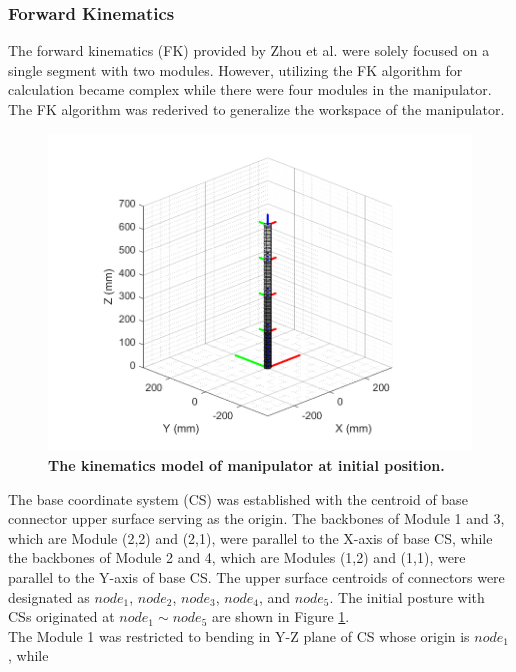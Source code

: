 \subsubsection{Forward Kinematics}
The forward kinematics (FK) provided by Zhou et al. \cite{fishboneCR} were solely focused on a single segment 
with two modules. However, utilizing the FK algorithm for calculation became complex while there were four modules in 
the manipulator. The FK algorithm was rederived to generalize the workspace of the manipulator. \\
\begin{figure}[H] %
    \centering
    \captionsetup{labelsep=colon}
    \includegraphics[width=1.0\textwidth]{Image/MATLAB/manipulator_0_0_0_0.png} 
    \caption[The kinematics model of manipulator at the initial position]
    {\centering \textbf{The kinematics model of manipulator at initial position.}}
    \label{fig:kinematics model 0_0_0_0}
\end{figure}
\noindent The base coordinate system (CS) was established with the centroid of base connector upper surface serving as 
the origin. The backbones of Module 1 and 3, which are Module (2,2) and (2,1), were parallel to the X-axis 
of base CS, while the backbones of Module 2 and 4, which are Modules (1,2) and (1,1), were parallel to the 
Y-axis of base CS. The upper surface centroids of connectors were designated as $node_1$, $node_2$, $node_3$, 
$node_4$, and $node_5$. The initial posture with CSs originated at $node_1 \sim node_5 $ are shown in 
Figure \ref{fig:kinematics model 0_0_0_0}.  \\
\noindent The Module 1 was restricted to bending in Y-Z plane of CS whose origin is $node_1$, while 
